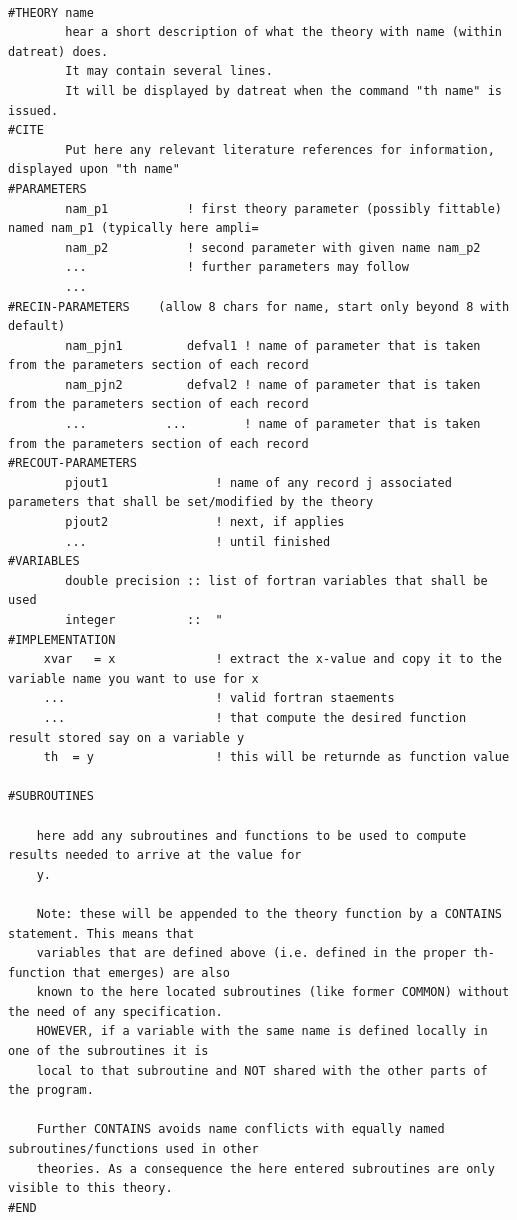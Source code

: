 \documentclass[11pt,fleqn]{book} %
\begin{document}
\tiny
\begin{verbatim}

#THEORY name
        hear a short description of what the theory with name (within datreat) does.               
        It may contain several lines.
        It will be displayed by datreat when the command "th name" is issued.
#CITE
        Put here any relevant literature references for information, displayed upon "th name"
#PARAMETERS
        nam_p1           ! first theory parameter (possibly fittable) named nam_p1 (typically here ampli=
        nam_p2           ! second parameter with given name nam_p2
        ...              ! further parameters may follow 
        ...
#RECIN-PARAMETERS    (allow 8 chars for name, start only beyond 8 with default)
        nam_pjn1         defval1 ! name of parameter that is taken from the parameters section of each record
        nam_pjn2         defval2 ! name of parameter that is taken from the parameters section of each record
        ...           ...        ! name of parameter that is taken from the parameters section of each record
#RECOUT-PARAMETERS
        pjout1               ! name of any record j associated parameters that shall be set/modified by the theory
        pjout2               ! next, if applies
        ...                  ! until finished
#VARIABLES
        double precision :: list of fortran variables that shall be used
        integer          ::  "
#IMPLEMENTATION
     xvar   = x              ! extract the x-value and copy it to the variable name you want to use for x
     ...                     ! valid fortran staements
     ...                     ! that compute the desired function result stored say on a variable y
     th  = y                 ! this will be returnde as function value

#SUBROUTINES

    here add any subroutines and functions to be used to compute results needed to arrive at the value for 
    y.

    Note: these will be appended to the theory function by a CONTAINS statement. This means that
    variables that are defined above (i.e. defined in the proper th-function that emerges) are also
    known to the here located subroutines (like former COMMON) without the need of any specification.
    HOWEVER, if a variable with the same name is defined locally in one of the subroutines it is
    local to that subroutine and NOT shared with the other parts of the program.

    Further CONTAINS avoids name conflicts with equally named subroutines/functions used in other
    theories. As a consequence the here entered subroutines are only visible to this theory.
#END
\end{verbatim}
\normalsize
\end{document}
